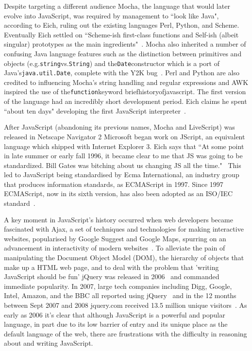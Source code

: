 \documentclass[]{final_report}
\begin{document}
Despite targeting a different audience Mocha, the language that would later evolve into JavaScript, was required by management to ``look like Java", according to Eich, ruling out the existing languages Perl, Python, and Scheme. Eventually Eich settled on ``Scheme-ish first-class functions and Self-ish (albeit singular) prototypes as the main ingredients"~\cite{popularityofjavascript}. Mocha also inherited a number of confusing Java language features such as the distinction between primitives and objects (e.g.\lstinline{string}vs.\lstinline{String}) and the\lstinline{Date}constructor which is a port of Java's\lstinline{java.util.Date}, complete with the Y2K bug~\cite{brendaneichtimetomakejscomment}. Perl and Python are also credited to influencing Mocha's string handling and regular expressions and AWK inspired the use of the\lstinline{function}keyword briefhistoryofjavascript. The first version of the language had an incredibly short development period. Eich claims he spent ``about ten days" developing the first JavaScript interpreter~\cite{AZProgrammingLanguages}.

After JavaScript (abandoning its previous names, Mocha and LiveScript) was released in Netscape Navigator 2 Microsoft began work on JScript, an equivalent language which shipped with Internet Explorer 3. Eich says that ``At some point in late summer or early fall 1996, it became clear to me that JS was going to be standardized. Bill Gates was bitching about us changing JS all the time."~\cite{newjavascriptmoduleowner} This led to JavaScript being standardised by Ecma International, an industry group that produces information standards, as ECMAScript in 1997. Since 1997 ECMAScript, now in its sixth version, has also been adopted as an ISO/IEC standard~\cite{ISO/IEC16262:2011}.

A key moment in JavaScript's history occurred when web developers became fascinated with Ajax, a set of techniques and technologies for making interactive websites, popularised by Google Suggest and Google Maps, spurring on an advancement in interactivity of modern websites~\cite{ajax}. To alleviate the pain of manipulating the Document Object Model (DOM), the hierarchy of objects that make up a HTML web page, and to deal with the problem that 'writing JavaScript should be fun' jQuery was released in 2006~\cite{historyofjquery} and commanded immediate popularity. In 2007, large tech companies including Digg, Google, Intel, Amazon, and the BBC all reported using jQuery~\cite{historyofjquery} and in the 12 months between Sept 2007 and 2008 jquery.com received 13.5 million unique visitors~\cite{stateofjquery}. As early as 2006 it's clear that although JavaScript is a powerful and popular language, in part due to its low barrier of entry and its unique place as the default language of the web, there are frustrations with the difficulty in reasoning about and writing JavaScript.
\end{document}
